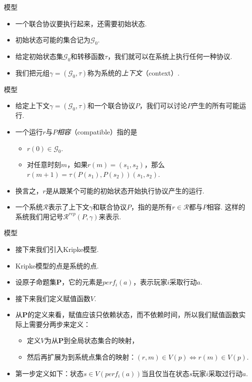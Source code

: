 {模型}
\begin{itemize}
    \item 一个联合协议要执行起来，还需要初始状态.
    \item 初始状态可能的集合记为$\mathcal G_0$.
    \item 给定初始状态集$\mathcal G_0$和转移函数$\tau$，我们就可以在系统上执行任何一种协议.
    \item 我们把元组$\gamma=(\mathcal G_0,\tau)$称为系统的\emph{上下文}（context）.
\end{itemize}



{模型}
\begin{itemize}
    \item 给定上下文$\gamma=(\mathcal G_0,\tau)$和一个联合协议$P$，我们可以讨论$P$产生的所有可能运行.
    \item 一个运行$r$与$P$\emph{相容}（compatible）指的是
    \begin{itemize}
        \item $r(0)\in\mathcal G_0$.
        \item 对任意时刻$m$，如果$r(m)=(s_1,s_2)$，那么$r(m+1)=\tau(P(s_1),P(s_2))(s_1,s_2)$.
    \end{itemize}
    \item 换言之，$r$是从跟某个可能的初始状态开始执行协议产生的运行.
    \item 一个系统$\mathcal R$表示了上下文$\gamma$和联合协议$P$，指的是所有$r\in\mathcal R$都与$P$相容. 这样的系统我们用记号$\mathcal R^{rep}(P,\gamma)$来表示.
\end{itemize}




{模型}
\begin{itemize}
    \item 接下来我们引入Kripke模型.
    \item Kripke模型的点是系统的点.
    \item 设原子命题集$\mathbf P$，它的元素是$perf_i(a)$，表示玩家$i$采取行动$a$.
    \item 接下来我们定义赋值函数$V$.
    \item 从$\mathbf P$的定义来看，赋值应该只依赖状态，而不依赖时间，所以我们赋值函数实际上需要分两步来定义：
    \begin{itemize}
        \item 定义$V$为从$\mathbf P$到全局状态集合的映射，
        \item 然后再扩展为到系统点集合的映射：$(r,m)\in V(p)\iff r(m)\in V(p)$.
    \end{itemize}
    \item 第一步定义如下：状态$s\in V(perf_i(a))$当且仅当在状态$s$玩家$i$采取过行动$a$.
\end{itemize}


